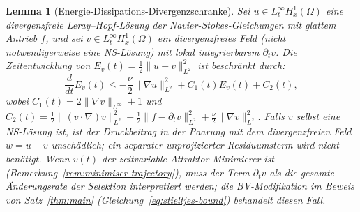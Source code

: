 \documentclass[12pt,a4paper]{article}
\theoremstyle{definition}
\theoremstyle{plain}
\newtheorem{lemma}[definition]{Lemma}
\theoremstyle{remark}
\begin{document}
\begin{lemma}[Energie-Dissipations-Divergenzschranke]
\label{lem:entropy-bound}
Sei $u \in L^\infty_t H^1_x(\Omega)$ eine divergenzfreie Leray--Hopf-Lösung der Navier-Stokes-Gleichungen mit glattem Antrieb $f$, und sei $v \in L^\infty_t H^1_x(\Omega)$ ein divergenzfreies Feld (nicht notwendigerweise eine NS-Lösung) mit lokal integrierbarem $\partial_t v$. Die Zeitentwicklung von $E_{v}(t) = \frac{1}{2}\| u - v \|_{L^2}^2$ ist beschränkt durch:
\begin{equation}
    \frac{d}{dt} E_{v}(t) \le - \frac{\nu}{2} \|\nabla u\|_{L^2}^2 + C_1(t) E_{v}(t) + C_2(t),
\end{equation}
wobei $C_1(t) = 2\|\nabla v\|_{L^\infty} + 1$ und $C_2(t) = \frac{1}{2}\|(v \cdot \nabla)v\|_{L^2}^2 + \frac{1}{2}\|f - \partial_t v\|_{L^2}^2 + \frac{\nu}{2}\|\nabla v\|_{L^2}^2$. Falls $v$ selbst eine NS-Lösung ist, ist der Druckbeitrag in der Paarung mit dem divergenzfreien Feld $w=u-v$ unschädlich; ein separater unprojizierter Residuumsterm wird nicht benötigt.
Wenn $v(t)$ der zeitvariable Attraktor-Minimierer ist (Bemerkung~\ref{rem:minimiser-trajectory}), muss der Term $\partial_t v$ als die gesamte Änderungsrate der Selektion interpretiert werden; die BV-Modifikation im Beweis von Satz~\ref{thm:main} (Gleichung~\eqref{eq:stieltjes-bound}) behandelt diesen Fall.
\end{lemma}
\end{document}

